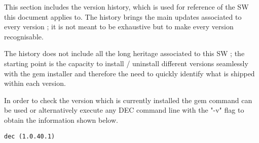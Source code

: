 \documentclass[dec_sum_main.tex]{subfiles}
\begin{document}
 
\par
\noindent
This section includes the version history, which is used for reference of the SW this document applies to. The history brings the main updates associated to every version ; it is not meant to be exhaustive but to make every version recognisable.\newline

\par
\noindent
The history does not include all the long heritage associated to this SW ; the starting point is the capacity to install / uninstall different versions seamlessly with the gem installer and therefore the need to quickly identify what is shipped within each version. \newline

\par
\noindent 
In order to check the version which is currently installed the gem command can be used or alternatively execute any DEC command line with the "-v" flag to obtain the information shown below. \newline


\begin{Verbatim}[tabsize=4]
    dec (1.0.40.1)
\end{Verbatim}

\end{document}
